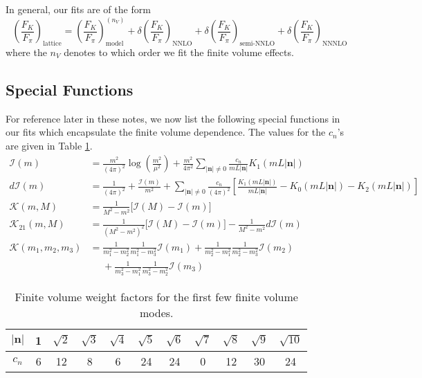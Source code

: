 \documentclass[prd,tightenlines,preprintnumbers,showpacs,superscriptaddress,notitlepage,eqsecnum,floatfix,notitlepage]{revtex4-1}
\begin{document}
In general, our fits are of the form
\begin{equation}
\left(\frac{F_K}{F_\pi}\right)_\text{lattice} = \left(\frac{F_K}{F_\pi}\right)_\text{model}^{(n_V)} +
\delta\left(\frac{F_K}{F_\pi}\right)_\text{NNLO} +
\delta\left(\frac{F_K}{F_\pi}\right)_\text{semi-NNLO} +
\delta\left(\frac{F_K}{F_\pi}\right)_\text{NNNLO}
\end{equation}
where the $n_V$ denotes to which order we fit the finite volume effects.
\subsection{Special Functions} \label{section:finite_volume}
For reference later in these notes, we now list the following special functions in our fits which encapsulate the finite volume dependence. The values for the $c_n$'s are given in Table \ref{tab:cN_weights}.
\begin{align}
\mathcal{I}(m) &= \frac{m^2}{(4\pi)^2} \log \left( \frac{m^2}{\mu^2} \right)
+ \frac{m^2}{4\pi^2} \sum_{|\mathbf{n}|\neq0} \frac{c_n}{mL|\mathbf{n}|} K_1(mL|\mathbf{n}|) \label{eqn:I(m)} \\
d\mathcal{I}(m) &=
\frac{1}{(4\pi)^2} + \frac{\mathcal{I}(m)}{m^2}
+\sum_{|\mathbf{n}|\neq0} \frac{c_n}{(4\pi)^2} \left[
\frac{K_1(mL|\mathbf{n}|)}{mL|\mathbf{n}|}
-K_0(mL|\mathbf{n}|)
-K_2(mL|\mathbf{n}|)\right] \\
\mathcal{K}(m,M) &= \frac{1}{M^2 - m^2} \Big[ \mathcal{I}(M) - \mathcal{I}(m) \Big] \\
\mathcal{K}_{21}(m,M) &=
\frac{1}{(M^2 - m^2)^2} \Big[ \mathcal{I}(M) - \mathcal{I}(m) \Big]
-\frac{1}{M^2 - m^2} d\mathcal{I}(m) \\
\mathcal{K}(m_1,m_2,m_3) &= \frac{1}{m_1^2 - m_2^2}\frac{1}{m_1^2-m_3^2} \mathcal{I}(m_1)
+\frac{1}{m_2^2 - m_1^2} \frac{1}{m_2^2 - m_3^2} \mathcal{I}(m_2)
\nonumber\\&\phantom{=}
+\frac{1}{m_3^2 - m_1^2} \frac{1}{m_3^2 - m_2^2} \mathcal{I}(m_3)
\end{align}


\begin{table}
	\begin{ruledtabular}
		\begin{tabular}{c|cccccccccc}
			$|\mathbf{n}|$& 1 & $\sqrt{2}$& $\sqrt{3}$& $\sqrt{4}$& $\sqrt{5}$& $\sqrt{6}$& $\sqrt{7}$& $\sqrt{8}$& $\sqrt{9}$& $\sqrt{10}$\\
			\hline
			$c_n$& 6&12& 8& 6& 24& 24& 0& 12& 30& 24
		\end{tabular}
	\end{ruledtabular}
	\caption{\label{tab:cN_weights}
		Finite volume weight factors for the first few finite volume modes.
	}
\end{table}
\end{document}
